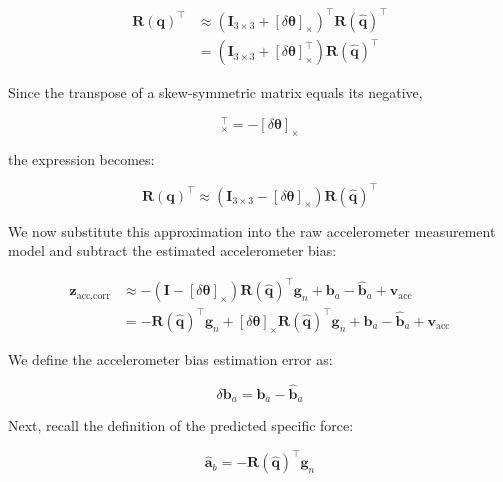 \documentclass{article}
\begin{document}
	\begin{align*}
		\mathbf{R}(\mathbf{q})^\top
		&\approx
		\left(\mathbf{I}_{3\times3}
		+ [\delta\boldsymbol{\theta}]_\times\right)^\top
		\mathbf{R}(\hat{\mathbf{q}})^\top \\[4pt]
		&=
		\left(\mathbf{I}_{3\times3}
		+ [\delta\boldsymbol{\theta}]_\times^\top\right)
		\mathbf{R}(\hat{\mathbf{q}})^\top
	\end{align*}
	
	Since the transpose of a skew-symmetric matrix equals its negative,
	
	\begin{equation*}
		[\delta\boldsymbol{\theta}]_\times^\top
		= -[\delta\boldsymbol{\theta}]_\times
	\end{equation*}
	
	the expression becomes:
	
	\begin{equation}
		\boxed{
			\mathbf{R}(\mathbf{q})^\top \approx
			\left(\mathbf{I}_{3\times3}
			- [\delta\boldsymbol{\theta}]_\times\right)
			\mathbf{R}(\hat{\mathbf{q}})^\top
		}
	\end{equation}
	
	We now substitute this approximation into the raw accelerometer measurement model and subtract the estimated accelerometer bias:
	
	\begin{align*}
		\mathbf{z}_{\text{acc,corr}}
		&\approx
		-\left(\mathbf{I}
		- [\delta\boldsymbol{\theta}]_\times\right)
		\mathbf{R}(\hat{\mathbf{q}})^\top \mathbf{g}_n
		+ \mathbf{b}_a
		- \hat{\mathbf{b}}_a
		+ \mathbf{v}_{\text{acc}} \\[6pt]
		&=
		-\mathbf{R}(\hat{\mathbf{q}})^\top\mathbf{g}_n
		+ [\delta\boldsymbol{\theta}]_\times
		\mathbf{R}(\hat{\mathbf{q}})^\top\mathbf{g}_n
		+ \mathbf{b}_a
		- \hat{\mathbf{b}}_a
		+ \mathbf{v}_{\text{acc}}
	\end{align*}
	
	We define the accelerometer bias estimation error as:
	
	\begin{equation*}
		\delta\mathbf{b}_a =
		\mathbf{b}_a - \hat{\mathbf{b}}_a
	\end{equation*}
	
	Next, recall the definition of the predicted specific force:
	
	\begin{equation*}
		\hat{\mathbf{a}}_b =
		-\mathbf{R}(\hat{\mathbf{q}})^\top\mathbf{g}_n
	\end{equation*}
	
\end{document}
